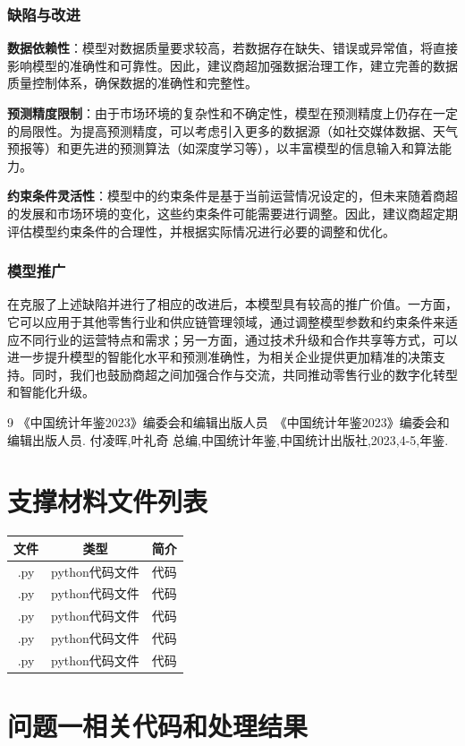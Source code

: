 \documentclass{cumcmthesis}
\begin{document}
\subsubsection{缺陷与改进}

\textbf{数据依赖性}：模型对数据质量要求较高，若数据存在缺失、错误或异常值，将直接影响模型的准确性和可靠性。因此，建议商超加强数据治理工作，建立完善的数据质量控制体系，确保数据的准确性和完整性。

\textbf{预测精度限制}：由于市场环境的复杂性和不确定性，模型在预测精度上仍存在一定的局限性。为提高预测精度，可以考虑引入更多的数据源（如社交媒体数据、天气预报等）和更先进的预测算法（如深度学习等），以丰富模型的信息输入和算法能力。

\textbf{约束条件灵活性}：模型中的约束条件是基于当前运营情况设定的，但未来随着商超的发展和市场环境的变化，这些约束条件可能需要进行调整。因此，建议商超定期评估模型约束条件的合理性，并根据实际情况进行必要的调整和优化。

\subsubsection{模型推广}
在克服了上述缺陷并进行了相应的改进后，本模型具有较高的推广价值。一方面，它可以应用于其他零售行业和供应链管理领域，通过调整模型参数和约束条件来适应不同行业的运营特点和需求；另一方面，通过技术升级和合作共享等方式，可以进一步提升模型的智能化水平和预测准确性，为相关企业提供更加精准的决策支持。同时，我们也鼓励商超之间加强合作与交流，共同推动零售行业的数字化转型和智能化升级。

\begin{thebibliography}{9}%
	《中国统计年鉴2023》编委会和编辑出版人员　《中国统计年鉴2023》编委会和编辑出版人员. 付凌晖,叶礼奇 总编,中国统计年鉴,中国统计出版社,2023,4-5,年鉴.
\end{thebibliography}
\newpage

\begin{appendices}
\section{支撑材料文件列表}
\begin{table}[!htbp]
	\centering
	\begin{tabular}{ccc}
		\toprule[1.5pt]
		文件 & 类型 & 简介  \\
		\midrule[1pt]
		
		.py & python代码文件 & 代码 \\
		.py & python代码文件 & 代码 \\
		.py & python代码文件 & 代码 \\
		.py & python代码文件 & 代码 \\
		.py & python代码文件 & 代码 \\
		\bottomrule[1.5pt]
	\end{tabular}
\end{table}

\section{问题一相关代码和处理结果}

\end{appendices}
\end{document}
